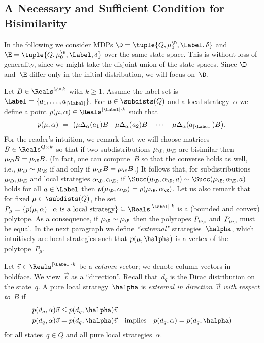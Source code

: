 \subsection{A Necessary and Sufficient Condition for Bisimilarity}\label{subsec:condition_bisimilar}

In the following we consider MDPs $\D = \tuple{Q,\mu^{\D}_{0},\Label,\delta}$ and $\E = \tuple{Q,\mu^{\E}_{0},\Label,\delta}$ over the same state space.
This is without loss of generality, since we might take the disjoint union of the state spaces.
Since $\D$ and~$\E$ differ only in the initial distribution, we will focus on~$\D$.


Let $B \in \Reals^{Q \times k}$ with $k \ge 1$.
Assume the label set is $\Label = \{a_1, \ldots, a_{|\Label|}\}$.
For $\mu \in \subdists(Q)$ and a local strategy~$\alpha$ we define a point $p(\mu, \alpha) \in \Reals^{{|\Label|} \cdot k}$ such that
\[
p(\mu, \alpha) \ = \ \big( \mu \Delta_{\alpha}(a_1) B \quad
                 \mu \Delta_{\alpha}(a_2) B \quad
                 \cdots \quad
                 \mu \Delta_{\alpha}(a_{|\Label|}) B \big).
\]
For the reader's intuition, we remark that we will choose matrices $B \in \Reals^{Q \times k}$ so that if two subdistributions $\mu_\D, \mu_\E$ are bisimilar then $\mu_\D B = \mu_\E B$.
(In fact, one can compute~$B$ so that the converse holds as well, i.e., $\mu_\D \sim \mu_\E$ if and only if $\mu_\D B = \mu_\E B$.)
It follows that, for subdistributions $\mu_\D, \mu_\E$ and local strategies $\alpha_\D, \alpha_\E$,
if $\Succ(\mu_\D, \alpha_\D, a) \sim \Succ(\mu_\E, \alpha_\E, a)$ holds for all $a \in \Label$ then $p(\mu_\D,\alpha_\D) = p(\mu_\E,\alpha_\E)$.
Let us also remark that for fixed $\mu \in \subdists(Q)$, the set $P_\mu = \{p(\mu,\alpha) \mid \alpha \text{ is a local strategy}\} \subseteq \Reals^{{|\Label|} \cdot k}$ is a (bounded and convex) polytope.
As a consequence, if $\mu_\D \sim \mu_\E$ then the polytopes $P_{\mu_\D}$ and~$P_{\mu_\E}$ must be equal.
In the next paragraph we define \emph{``extremal''} strategies~$\halpha$, which intuitively are local strategies such that $p(\mu,\halpha)$ is a vertex of the polytope~$P_{\mu}$.

Let $\vec{v} \in \Reals^{{|\Label|} \cdot k}$ be a \emph{column} vector;
we denote column vectors in boldface.
We view~$\vec{v}$ as a ``direction''.
Recall that~$d_q$ is the Dirac distribution on the state~$q$.
A pure local strategy~$\halpha$ is \emph{extremal in direction~$\vec{v}$ with respect to~$B$} if
\begin{align}
 & p(d_q, \alpha) \vec{v} \le p(d_q, \halpha) \vec{v}  \label{eq-remove-v1} \\
 & p(d_q, \alpha) \vec{v}  =  p(d_q, \halpha) \vec{v} \text{\quad implies\quad}
   p(d_q, \alpha)          =  p(d_q, \halpha) \label{eq-remove-v2}
\end{align}
for all states~$q \in Q$ and all pure local strategies~$\alpha$.


